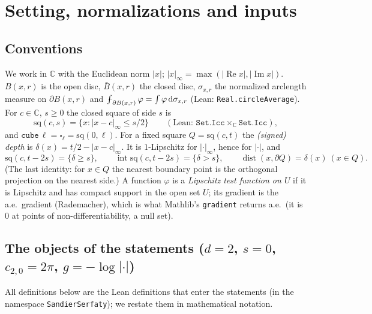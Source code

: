 \documentclass[11pt]{article}
\theoremstyle{definition}
\theoremstyle{remark}
\newcommand{\C}{\mathbb C}
\newcommand{\dd}{\,\mathrm d}
\newcommand{\dep}{\delta}
\newcommand{\sq}{\mathrm{sq}}
\newcommand{\avg}{\fint}
\DeclareMathOperator{\dist}{dist}
\def\fint{\mathop{\,\rlap{--}\!\!\int}\nolimits}
\begin{document}
\tableofcontents

\section{Setting, normalizations and inputs}\label{sec:setting}

\subsection{Conventions}
We work in $\C$ with the Euclidean norm $|x|$; $|x|_\infty=\max(|\operatorname{Re}x|,|\operatorname{Im}x|)$.
$B(x,r)$ is the open disc, $\bar B(x,r)$ the closed disc, $\sigma_{x,r}$ the normalized arclength measure on
$\partial B(x,r)$ and $\avg_{\partial B(x,r)}\varphi=\int\varphi\dd\sigma_{x,r}$ (Lean: \texttt{Real.circleAverage}).
For $c\in\C$, $s\ge0$ the closed square of side $s$ is
\[
\sq(c,s)=\{x:|x-c|_\infty\le s/2\}\qquad(\text{Lean: } \texttt{Set.Icc}\times_{\C}\texttt{Set.Icc}),
\]
and $\texttt{cube}\,\ell=\square_\ell=\sq(0,\ell)$. For a fixed square $Q=\sq(c,t)$ the
\emph{(signed) depth} is $\dep(x)=t/2-|x-c|_\infty$. It is $1$-Lipschitz for $|\cdot|_\infty$, hence for $|\cdot|$, and
\begin{equation}\label{eq:depth-sets}
\sq(c,t-2s)=\{\dep\ge s\},\qquad \operatorname{int}\sq(c,t-2s)=\{\dep>s\},\qquad
\dist(x,\partial Q)=\dep(x)\ (x\in Q).
\end{equation}
(The last identity: for $x\in Q$ the nearest boundary point is the orthogonal projection on the nearest side.)
A function $\varphi$ is a \emph{Lipschitz test function on $U$} if it is Lipschitz and has compact support in the
open set $U$; its gradient is the a.e.\ gradient (Rademacher), which is what Mathlib's \texttt{gradient} returns
a.e.\ (it is $0$ at points of non-differentiability, a null set).

\subsection{\texorpdfstring{The objects of the statements ($d=2$, $s=0$, $c_{2,0}=2\pi$, $g=-\log|\cdot|$)}{The objects of the statements}}
All definitions below are the Lean definitions that enter the statements (in the namespace \texttt{SandierSerfaty}); we
restate them in mathematical notation.
\end{document}
